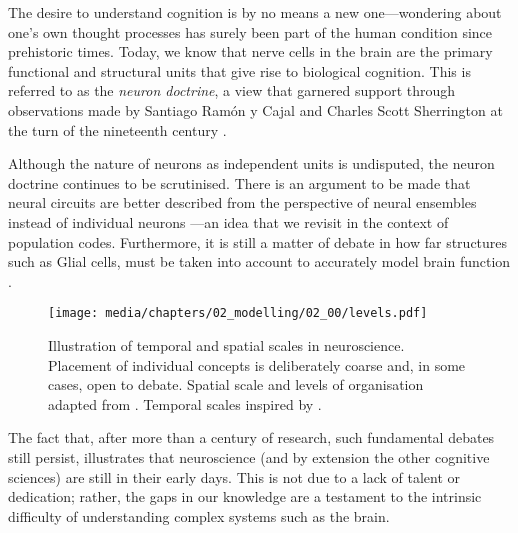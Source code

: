 
The desire to understand cognition is by no means a new one---wondering about one's own thought processes has surely been part of the human condition since prehistoric times.
Today, we know that nerve cells in the brain are the primary functional and structural units that give rise to biological cognition.
This is referred to as the \emph{neuron doctrine}, a view that garnered support through observations made by Santiago Ramón y Cajal and Charles Scott Sherrington at the turn of the nineteenth century \citep[Chapter~2]{yuste2015neuron,bear2016neuroscience}.

Although the nature of neurons as independent units is undisputed, the neuron doctrine continues to be scrutinised.
There is an argument to be made that neural circuits are better described from the perspective of neural ensembles instead of individual neurons \citep{yuste2015neuron,churchland1992computational}---an idea that we revisit in the context of population codes.
Furthermore, it is still a matter of debate in how far structures such as Glial cells, must be taken into account to accurately model brain function \citep[e.g.,][]{verkhratsky2000ion}.

\begin{figure}
	\centering
	\texttt{[image: media/chapters/02\_modelling/02\_00/levels.pdf]}
	\caption[Illustration of temporal and spatial scales in neuroscience]{Illustration of temporal and spatial scales in neuroscience. Placement of individual concepts is deliberately coarse and, in some cases, open to debate. Spatial scale and levels of organisation adapted from \citet[Figure~1.4, p.~11]{churchland1992computational}.
	Temporal scales inspired by \citet[Figure~1]{sejnowski2014putting}.
	}
	\label{fig:spatial_and_temporal_scales}
	\vspace*{-0.5em}
\end{figure}

The fact that, after more than a century of research, such fundamental debates still persist, illustrates that neuroscience (and by extension the other cognitive sciences) are still in their early days.
This is not due to a lack of talent or dedication;
rather, the gaps in our knowledge are a testament to the intrinsic difficulty of understanding complex systems such as the brain.

